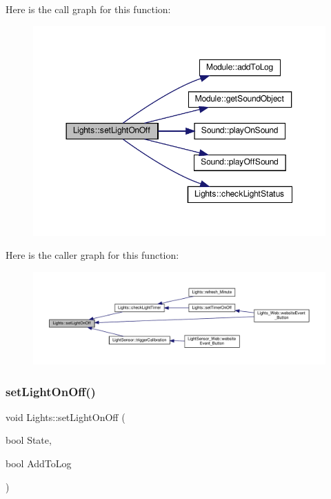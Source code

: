 Here is the call graph for this function\+:
\nopagebreak
\begin{figure}[H]
\begin{center}
\leavevmode
\includegraphics[width=350pt]{class_lights_ab18f05b043b61b6eb74bd7b564e1a1ec_cgraph}
\end{center}
\end{figure}
Here is the caller graph for this function\+:
\nopagebreak
\begin{figure}[H]
\begin{center}
\leavevmode
\includegraphics[width=350pt]{class_lights_ab18f05b043b61b6eb74bd7b564e1a1ec_icgraph}
\end{center}
\end{figure}
\mbox{\label{class_lights_ab18f05b043b61b6eb74bd7b564e1a1ec}} 
\subsubsection{\texorpdfstring{set\+Light\+On\+Off()}{setLightOnOff()}\hspace{0.1cm}{\footnotesize\ttfamily [2/2]}}
{\footnotesize\ttfamily void Lights\+::set\+Light\+On\+Off (\begin{DoxyParamCaption}\item[{bool}]{State,  }\item[{bool}]{Add\+To\+Log }\end{DoxyParamCaption})}


